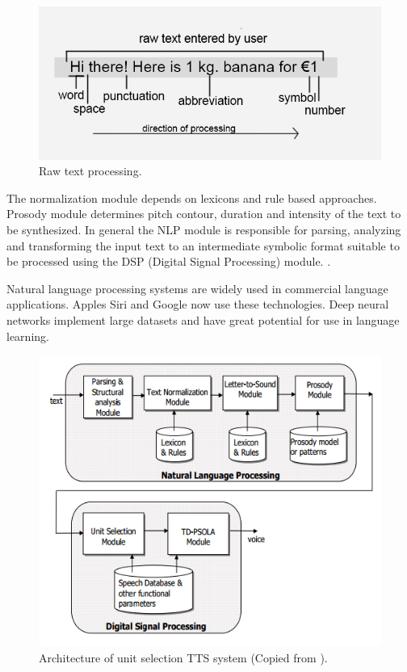 \documentclass[11pt,a4paper,oneside,article]{memoir}
\begin{document}
\begin{figure}[h]
  \includegraphics[width=12cm]{rawtext}
  \caption{Raw text processing.}
  \label{fig:rawtext}
\end{figure}
 The normalization module depends on lexicons and rule based approaches. Prosody module determines pitch contour, duration and intensity of the text to be synthesized. In general the NLP module is responsible for parsing, analyzing and transforming the input text to an intermediate symbolic format suitable to be processed using the DSP (Digital Signal Processing) module. \cite{chala}.

Natural language processing systems are widely used in commercial language applications. Apples Siri and Google now use these technologies. Deep neural networks implement large datasets and have great potential for use in language learning.

\begin{figure}[h]
  \includegraphics[width=12cm]{nlp}
  \caption{Architecture of unit selection TTS system (Copied from \cite{chala}).}
  \label{fig:nlp}
\end{figure}
\end{document}
